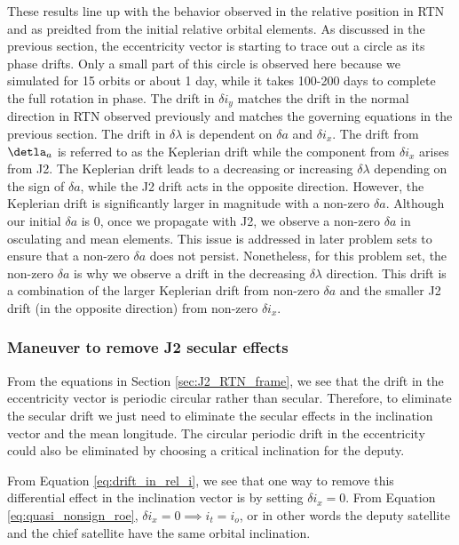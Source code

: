 These results line up with the behavior observed in the relative position in RTN and as preidted from the initial relative orbital elements. As discussed in the previous section, the eccentricity vector is starting to trace out a circle as its phase drifts. Only a small part of this circle is observed here because we simulated for 15 orbits or about 1 day, while it takes 100-200 days to complete the full rotation in phase. The drift in $\delta i_y$ matches the drift in the normal direction in RTN observed previously and matches the governing equations in the previous section. The drift in $\delta \lambda$ is dependent on $\delta a$ and $\delta i_x$. The drift from $\detla_a$ is referred to as the Keplerian drift while the component from $\delta i_x$ arises from J2. The Keplerian drift leads to a decreasing or increasing $\delta \lambda$ depending on the sign of $\delta a$, while the J2 drift acts in the opposite direction. However, the Keplerian drift is significantly larger in magnitude with a non-zero $\delta a$. Although our initial $\delta a$ is 0, once we propagate with J2, we observe a non-zero $\delta a$ in osculating and mean elements. This issue is addressed in later problem sets to ensure that a non-zero $\delta a$ does not persist. Nonetheless, for this problem set, the non-zero $\delta a$ is why we observe a drift in the decreasing $\delta \lambda$ direction. This drift is a combination of the larger Keplerian drift from non-zero $\delta a$ and the smaller J2 drift (in the opposite direction) from non-zero $\delta i_x$.

\subsubsection{Maneuver to remove J2 secular effects}\label{sec:J2_maneuver}
From the equations in Section \ref{sec:J2_RTN_frame}, we see that the drift in the eccentricity vector is periodic circular rather than secular. Therefore, to eliminate the secular drift we just need to eliminate the secular effects in the inclination vector and the mean longitude. The circular periodic drift in the eccentricity could also be eliminated by choosing a critical inclination for the deputy. 

From Equation \ref{eq:drift_in_rel_i}, we see that one way to remove this differential effect in the inclination vector is by setting $\delta i_x = 0$. From Equation \ref{eq:quasi_nonsign_roe}, $\delta i_x = 0 \implies i_t = i_o$, or in other words the deputy satellite and the chief satellite have the same orbital inclination. 

